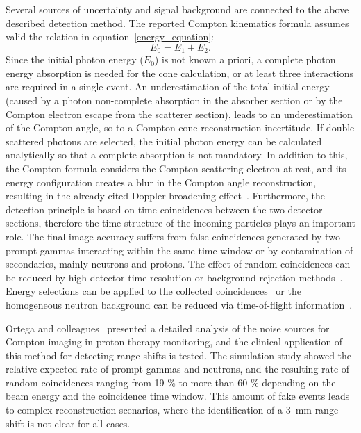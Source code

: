 Several sources of uncertainty and signal background are connected to the above described detection method. The reported Compton kinematics formula assumes valid the relation in equation~\ref{energy_equation}:
 \begin{equation}
E_{0} = E_{1}+E_{2}.
\label{energy_equation}
\end{equation} 
Since the initial photon energy (\(E_{0}\)) is not known a priori, a complete photon energy absorption is needed for the cone calculation, or at least three interactions are required in a single event. An underestimation of the total initial energy (caused by a photon non-complete absorption in the absorber section or by the Compton electron escape from the scatterer section), leads to an underestimation of the Compton angle, so to a Compton cone reconstruction incertitude. If double scattered photons are selected, the initial photon energy can be calculated analytically so that a complete absorption is not mandatory. In addition to this, the Compton formula considers the Compton scattering electron at rest, and its energy configuration creates a blur in the Compton angle reconstruction, resulting in the already cited Doppler broadening effect~\cite{Doppler}. Furthermore, the detection principle is based on time coincidences between the two detector sections, therefore the time structure of the incoming particles plays an important role. The final image accuracy suffers from false coincidences generated by two prompt gammas interacting within the same time window or by contamination of secondaries, mainly neutrons and protons. The effect of random coincidences can be reduced by high detector time resolution or background rejection methods~\cite{Draeger:2017aa}. Energy selections can be applied to the collected coincidences~\cite{Polf:2009aa, Hilaire:2016aa} or the homogeneous neutron background can be reduced via time-of-flight information~\cite{Testa:2010aa}.

Ortega and colleagues~\cite{Ortega:2015aa} presented a detailed analysis of the noise sources for Compton imaging in proton therapy monitoring, and the clinical application of this method for detecting range shifts is tested. The simulation study showed the relative expected rate of prompt gammas and neutrons, and the resulting rate of random coincidences ranging from 19 \% to more than 60 \% depending on the beam energy and the coincidence time window. This amount of fake events leads to complex reconstruction scenarios, where the identification of a 3~mm range shift is not clear for all cases.

